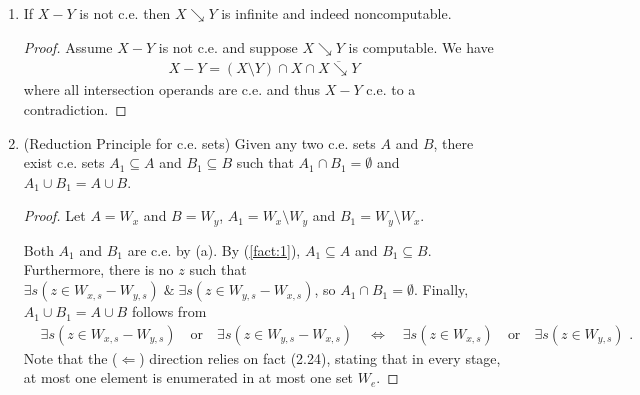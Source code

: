 \documentclass[a4paper,11pt]{article}
\begin{document}
\begin{enumerate}[label=(\alph*)]
\item If $X - Y$ is not c.e. then $X \searrow Y$ is infinite and indeed noncomputable.
\begin{proof}
  Assume $X - Y$ is not c.e. and suppose $X \searrow Y$ is computable. We have
  \begin{align*}
    X - Y = (X \setminus Y) \cap X \cap \overline{X \searrow Y}
  \end{align*}
  where all intersection operands are c.e. and thus $X - Y$ c.e. to a contradiction.
\end{proof}

\item (Reduction Principle for c.e. sets) Given any two c.e. sets $A$ and $B$,
  there exist c.e. sets $A_1 \subseteq A$ and $B_1 \subseteq B$ such that
  $A_1 \cap B_1 = \emptyset$ and $A_1 \cup B_1 = A \cup B$.
\begin{proof}
  Let $A = W_x$ and $B = W_y$, $A_1 = W_x \setminus W_y$ and $B_1 = W_y \setminus W_x$.

  Both $A_1$ and $B_1$ are c.e. by (a).
  By (\ref{fact:1}), $A_1 \subseteq A$ and $B_1 \subseteq B$.
  Furthermore, there is no $z$ such that $\exists s(z \in W_{x,s} - W_{y,s}) \; \& \; \exists s(z \in W_{y,s} - W_{x,s})$, so $A_1 \cap B_1 = \emptyset$.
  Finally, $A_1 \cup B_1 = A \cup B$ follows from
  \begin{align*}
    & \exists s(z \in W_{x,s} - W_{y,s}) \quad\! \text{or} \quad\! \exists s(z \in W_{y,s} - W_{x,s}) \quad\! \Longleftrightarrow \quad\! \exists s(z \in W_{x,s}) \quad\! \text{or} \quad\! \exists s(z \in W_{y,s}) \text{ .}
  \end{align*}
  Note that the ($\Leftarrow$) direction relies on fact (2.24), stating that in every stage, at most one element is enumerated in at most one set $W_e$.
\end{proof}

\end{enumerate}
\end{document}

